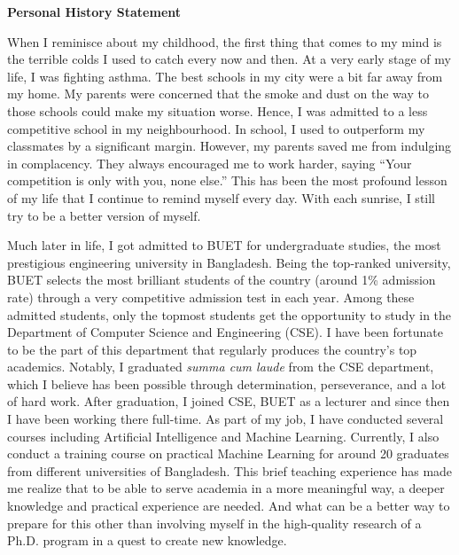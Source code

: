 \documentclass[12pt]{article}
\begin{document}


\fancyhf{}
\rfoot{\thepage}

\begin{center}
{\LARGE \bf 
Personal History Statement}\\
\end{center}



When I reminisce about my childhood, the first thing that comes to my mind is the terrible colds I used to catch every now and then. At a very early stage of my life, I was fighting asthma. The best schools in my city were a bit far away from my home. My parents were concerned that the smoke and dust on the way to those schools could make my situation worse. Hence, I was admitted to a less competitive school in my neighbourhood.  In school, I used to outperform my classmates by a significant margin. However, my parents saved me from indulging in complacency. They always encouraged me to work harder, saying ``Your competition is only with you, none else.'' This has been the most profound lesson of my life that I continue to remind myself every day. With each sunrise, I still try to be a better version of myself.

Much later in life, I got admitted to BUET for undergraduate studies, the most prestigious engineering university in Bangladesh. Being the top-ranked university, BUET selects the most brilliant students of the country (around 1\% admission rate) through a very competitive admission test in each year. Among these admitted students, only the topmost students get the opportunity to study in the Department of Computer Science and Engineering (CSE). I have been fortunate to be the part of this department that regularly produces the country's top academics. Notably, I graduated \textit{summa cum laude} from the CSE department, which I believe has been possible through determination, perseverance, and a lot of hard work. After graduation, I joined CSE, BUET as a lecturer and since then I have been working there full-time. As part of my job, I have conducted several courses including Artificial Intelligence and Machine Learning. Currently, I also conduct a training course on practical Machine Learning for around 20 graduates from different universities of Bangladesh. This brief teaching experience has made me realize that to be able to serve academia in a more meaningful way, a deeper knowledge and practical experience are needed. And what can be a better way to prepare for this other than involving myself in the high-quality research of a Ph.D. program in a quest to create new knowledge.   
\end{document}
